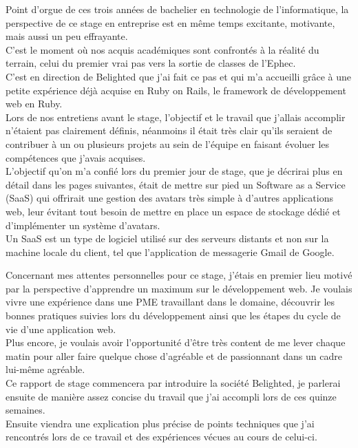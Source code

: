 \documentclass{report}
\begin{document}
  Point d'orgue de ces trois années de bachelier en technologie de l'informatique, la perspective de ce stage en entreprise
  est en même temps excitante, motivante, mais aussi un peu effrayante.\\
  C'est le moment où nos acquis académiques sont confrontés à la réalité du terrain, celui du premier vrai pas vers la sortie
  de classes de l'Ephec.\\

  C'est en direction de Belighted que j'ai fait ce pas et qui m'a accueilli grâce à une petite expérience déjà acquise en Ruby on Rails, le framework de développement web en Ruby.\\
  Lors de nos entretiens avant le stage, l'objectif et le travail que j'allais accomplir n'étaient pas clairement définis, néanmoins il était
  très clair qu'ils seraient de contribuer à un ou plusieurs projets au sein de l'équipe en faisant évoluer les compétences que j'avais acquises.\\
  L'objectif qu'on m'a confié lors du premier jour de stage, que je décrirai plus en détail dans les pages suivantes, était de mettre sur pied un Software as a
  Service (SaaS) qui offrirait une gestion des avatars très simple
  à d'autres applications web, leur évitant tout besoin de mettre en place un espace de stockage dédié et d'implémenter un
  système d'avatars.\\
  Un SaaS est un type de logiciel utilisé sur des serveurs distants et non sur la machine locale du client, tel que l'application de messagerie Gmail de Google.

  Concernant mes attentes personnelles pour ce stage, j'étais en premier lieu motivé par la perspective d'apprendre un maximum
  sur le développement web. Je voulais vivre une expérience dans une PME travaillant dans le domaine, découvrir les bonnes
  pratiques suivies lors du développement ainsi que les étapes du cycle de vie d'une application web.\\
  Plus encore, je voulais avoir l'opportunité d'être très content de me lever chaque matin pour aller faire quelque chose d'agréable et de passionnant
  dans un cadre lui-même agréable.\\

  Ce rapport de stage commencera par introduire la société Belighted, je parlerai ensuite de manière assez concise du travail que j'ai accompli lors de ces quinze semaines.\\
  Ensuite viendra une explication plus précise de points techniques que j'ai rencontrés lors de ce travail et des expériences vécues au cours de celui-ci.\\
\end{document}
